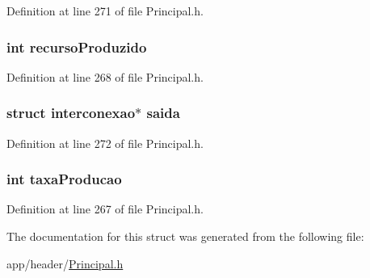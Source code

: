 Definition at line 271 of file Principal.\-h.

\hypertarget{structgerador_a9e29959680201391763bfe25c54d3e7a}{
\subsubsection[{recurso\-Produzido}]{\setlength{\rightskip}{0pt plus 5cm}int recurso\-Produzido}}\label{structgerador_a9e29959680201391763bfe25c54d3e7a}


Definition at line 268 of file Principal.\-h.

\hypertarget{structgerador_aafa87c2fb8e43c550b83e0f109c2b7e5}{
\subsubsection[{saida}]{\setlength{\rightskip}{0pt plus 5cm}struct {\bf interconexao}$\ast$ saida}}\label{structgerador_aafa87c2fb8e43c550b83e0f109c2b7e5}


Definition at line 272 of file Principal.\-h.

\hypertarget{structgerador_ac6d5c20bc66b992b34eaa1ab7bb1d813}{
\subsubsection[{taxa\-Producao}]{\setlength{\rightskip}{0pt plus 5cm}int taxa\-Producao}}\label{structgerador_ac6d5c20bc66b992b34eaa1ab7bb1d813}


Definition at line 267 of file Principal.\-h.



The documentation for this struct was generated from the following file\-:\begin{DoxyCompactItemize}
\item 
app/header/\hyperlink{_principal_8h}{Principal.\-h}\end{DoxyCompactItemize}

